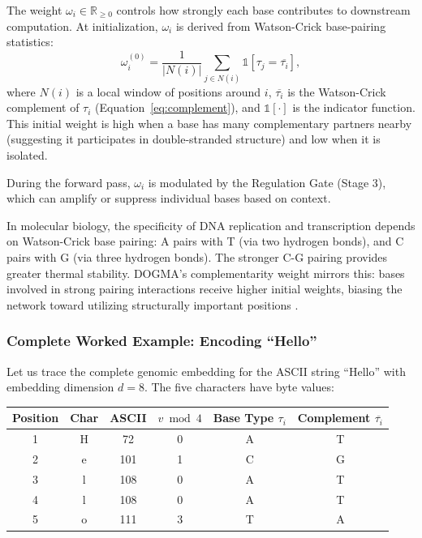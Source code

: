 The weight $\omega_i \in \mathbb{R}_{\ge 0}$ controls how strongly each base contributes to downstream computation. At initialization, $\omega_i$ is derived from Watson-Crick base-pairing statistics:
\begin{equation}
\omega_i^{(0)} = \frac{1}{|N(i)|} \sum_{j \in N(i)} \mathbb{1}\!\left[\tau_j = \overline{\tau_i}\right],
\label{eq:omega-init}
\end{equation}
where $N(i)$ is a local window of positions around $i$, $\overline{\tau_i}$ is the Watson-Crick complement of $\tau_i$ (Equation~\ref{eq:complement}), and $\mathbb{1}[\cdot]$ is the indicator function. This initial weight is high when a base has many complementary partners nearby (suggesting it participates in double-stranded structure) and low when it is isolated.

During the forward pass, $\omega_i$ is modulated by the Regulation Gate (Stage 3), which can amplify or suppress individual bases based on context.

\begin{bioinsight}
In molecular biology, the specificity of DNA replication and transcription depends on Watson-Crick base pairing: A pairs with T (via two hydrogen bonds), and C pairs with G (via three hydrogen bonds). The stronger C-G pairing provides greater thermal stability. DOGMA's complementarity weight mirrors this: bases involved in strong pairing interactions receive higher initial weights, biasing the network toward utilizing structurally important positions \citep{watson1953}.
\end{bioinsight}

\subsubsection{Complete Worked Example: Encoding ``Hello''}

Let us trace the complete genomic embedding for the ASCII string ``Hello'' with embedding dimension $d = 8$. The five characters have byte values:

\begin{center}
\renewcommand{\arraystretch}{1.2}
\begin{tabular}{cccccc}
\toprule
\textbf{Position} & \textbf{Char} & \textbf{ASCII} & $v \bmod 4$ & \textbf{Base Type $\tau_i$} & \textbf{Complement $\overline{\tau_i}$} \\
\midrule
1 & H & 72  & 0 & A & T \\
2 & e & 101 & 1 & C & G \\
3 & l & 108 & 0 & A & T \\
4 & l & 108 & 0 & A & T \\
5 & o & 111 & 3 & T & A \\
\bottomrule
\end{tabular}
\end{center}


